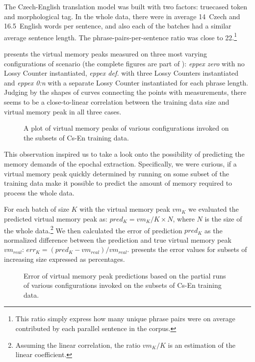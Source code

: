 The Czech-English translation model was built with two factors: truecased token and
morphological tag.
In the whole data, there were in average 14~Czech and 16.5~English words per sentence,
and also each of the batches had a similar average sentence length.
The phrase-pairs-per-sentence ratio was close to 22.\footnote{This ratio simply express
how many unique phrase pairs were on average contributed by each parallel sentence in
the corpus.}

 presents the virtual memory peaks measured on three most varying
configurations of \eppex{} scenario (the complete figures are part of ):
\emph{eppex zero} with no Lossy Counter instantiated,
\emph{eppex def.} with three Lossy Counters instantiated and \emph{eppex 0:n} with
a separate Lossy Counter instantiated for each phrase length.
Judging by the shapes of curves connecting the points with measurements, there seems to be
a close-to-linear correlation between the training data size and virtual memory peak in all
three cases.

\begin{figure}[!htb]
  \centering
  
  \caption{
    A plot of virtual memory peaks of various \eppex{} configurations invoked on the subsets of Cs-En training data.
  }
  \label{fig:cs-en-vm-peaks}
\end{figure}

This observation inspired us to take a look onto the possibility of predicting the memory
demands of the epochal extraction.
Specifically, we were curious, if a virtual memory peak quickly determined by running
\eppex{} on some subset of the training data make it possible to predict the amount of
memory required to process the whole data.

For each batch of size $K$ with the virtual memory peak $vm_{K}$ we evaluated the predicted virtual
memory peak as: $pred_{K} = vm_{K} / K \times N$, where $N$ is the size of the whole
data.\footnote{Assuming the linear correlation, the ratio $vm_{K} / K$ is an estimation of the linear coefficient.}
We then calculated the error of prediction $pred_{K}$ as the normalized difference between
the prediction and true virtual memory peak $vm_{real}$: $err_{K} = (pred_{K} - vm_{real}) / vm_{real}$.
 presents the error values for subsets of increasing size
expressed as percentages.

\begin{figure}[!htb]
  \centering
  
  \caption{
    Error of virtual memory peak predictions based on the partial runs of various \eppex{} configurations
    invoked on the subsets of Cs-En training data.
  }
  \label{fig:cs-en-vm-peak-prediction}
\end{figure}

